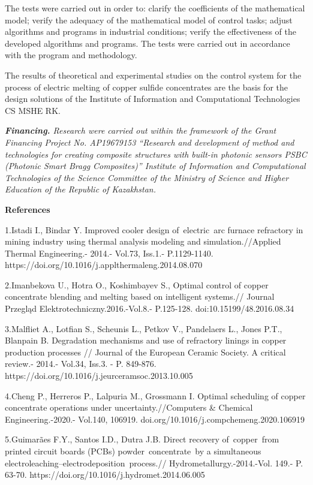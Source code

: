 The tests were carried out in order to: clarify the coefficients of the
mathematical model; verify the adequacy of the mathematical model of
control tasks; adjust algorithms and programs in industrial conditions;
verify the effectiveness of the developed algorithms and programs. The
tests were carried out in accordance with the program and methodology.

The results of theoretical and experimental studies on the control
system for the process of electric melting of copper sulfide
concentrates are the basis for the design solutions of the Institute of
Information and Computational Technologies CS MSHE RK.

\emph{\textbf{Financing.} Research were carried out within the framework
of the Grant Financing Project No. AP19679153 ``Research and development
of method and technologies for creating composite structures with
built-in photonic sensors PSBC (Photonic Smart Bragg Composites)''
Institute of Information and Computational Technologies of the Science
Committee of the Ministry of Science and Higher Education of the
Republic of Kazakhstan.}

\textbf{References}

1.Istadi I., Bindar Y. Improved cooler design of~electric~arc furnace
refractory in mining industry using thermal analysis modeling and
simulation.//Applied Thermal Engineering.- 2014.- Vol.73, Iss.1.-
P.1129-1140. https://doi.org/10.1016/j.applthermaleng.2014.08.070

2.Imanbekova U., Hotra O., Koshimbayev S., Optimal control of copper
concentrate blending and melting based on intelligent systems.// Journal
Przegląd Elektrotechniczny.2016.-Vol.8.- P.125-128.
doi:10.15199/48.2016.08.34

3.Malfliet A., Lotfian S., Scheunis L., Petkov V., Pandelaers L., Jones
P.T., Blanpain B. Degradation mechanisms and use of refractory linings
in copper production processes // Journal of the European Ceramic
Society. A critical review.- 2014.- Vol.34, Iss.3. - P. 849-876.
https://doi.org/10.1016/j.jeurceramsoc.2013.10.005

4.Cheng P., Herreros P., Lalpuria M., Grossmann I. Optimal scheduling of
copper concentrate operations under uncertainty.//Computers \& Chemical
Engineering.-2020.- Vol.140, 106919.
doi.org/10.1016/j.compchemeng.2020.106919

5.Guimarães F.Y., Santos I.D., Dutra J.B. Direct recovery of~copper~from
printed circuit boards (PCBs) powder~concentrate~by a simultaneous
electroleaching--electrodeposition~process.//
Hydrometallurgy.-2014.-Vol. 149.- P. 63-70.
https://doi.org/10.1016/j.hydromet.2014.06.005


